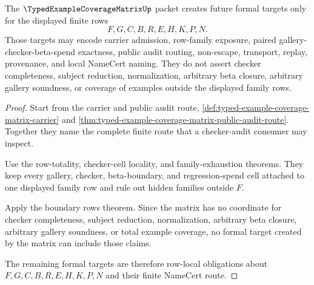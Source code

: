 \begin{theorem}
\label{thm:typed-example-coverage-matrix-formal-target-boundary}
The $\TypedExampleCoverageMatrixUp$ packet creates future formal targets only for the displayed finite rows
$$
F,G,C,B,R,E,H,K,P,N .
$$
Those targets may encode carrier admission, row-family exposure, paired gallery-checker-beta-spend exactness, public audit routing, non-escape, transport, replay, provenance, and local NameCert naming. They do not assert checker completeness, subject reduction, normalization, arbitrary beta closure, arbitrary gallery soundness, or coverage of examples outside the displayed family rows.
\end{theorem}
\begin{proof}
Start from the carrier and public audit route, \autoref{def:typed-example-coverage-matrix-carrier} and \autoref{thm:typed-example-coverage-matrix-public-audit-route}. Together they name the complete finite route that a checker-audit consumer may inspect.

Use the row-totality, checker-cell locality, and family-exhaustion theorems. They keep every gallery, checker, beta-boundary, and regression-spend cell attached to one displayed family row and rule out hidden families outside $F$.

Apply the boundary rows theorem. Since the matrix has no coordinate for checker completeness, subject reduction, normalization, arbitrary beta closure, arbitrary gallery soundness, or total example coverage, no formal target created by the matrix can include those claims.

The remaining formal targets are therefore row-local obligations about $F,G,C,B,R,E,H,K,P,N$ and their finite NameCert route.
\end{proof}

